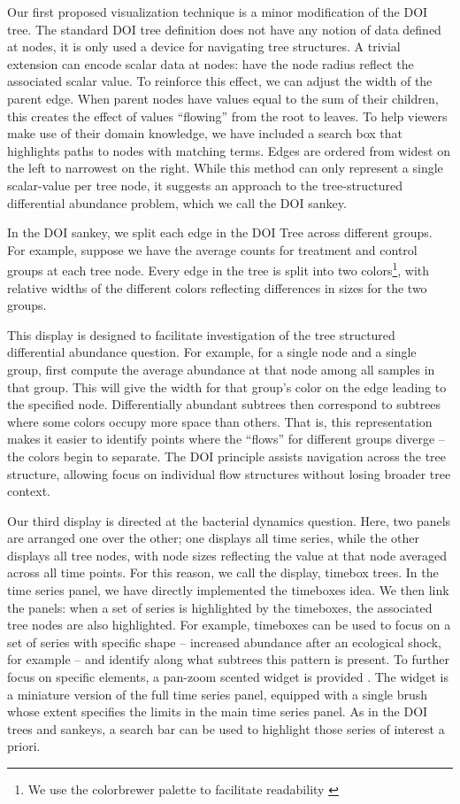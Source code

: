 Our first proposed visualization technique is a minor modification of the DOI
tree. The standard DOI tree definition does not have any notion of data defined
at nodes, it is only used a device for navigating tree structures. A trivial
extension can encode scalar data at nodes: have the node radius reflect the
associated scalar value. To reinforce this effect, we can adjust the width of
the parent edge. When parent nodes have values equal to the sum of their
children, this creates the effect of values ``flowing'' from the root to leaves.
To help viewers make use of their domain knowledge, we have included a search
box that highlights paths to nodes with matching terms. Edges are ordered from
widest on the left to narrowest on the right. While this method can only
represent a single scalar-value per tree node, it suggests an approach to the
tree-structured differential abundance problem, which we call the DOI sankey.

In the DOI sankey, we split each edge in the DOI Tree across different groups.
For example, suppose we have the average counts for treatment and control groups
at each tree node. Every edge in the tree is split into two colors\footnote{We
  use the colorbrewer palette to facilitate readability
  \citep{brewer2003colorbrewer}}, with relative widths of the different colors
reflecting differences in sizes for the two groups.

This display is designed to facilitate investigation of the tree structured
differential abundance question. For example, for a single node and a single
group, first compute the average abundance at that node among all samples in
that group. This will give the width for that group's color on the edge leading
to the specified node. Differentially abundant subtrees then correspond to
subtrees where some colors occupy more space than others. That is, this
representation makes it easier to identify points where the ``flows'' for
different groups diverge -- the colors begin to separate. The DOI principle
assists navigation across the tree structure, allowing focus on individual flow
structures without losing broader tree context.

Our third display is directed at the bacterial dynamics question. Here, two
panels are arranged one over the other; one displays all time series, while the
other displays all tree nodes, with node sizes reflecting the value at that node
averaged across all time points. For this reason, we call the display, timebox
trees. In the time series panel, we have directly implemented the timeboxes
idea. We then link the panels: when a set of series is highlighted by the
timeboxes, the associated tree nodes are also highlighted. For example,
timeboxes can be used to focus on a set of series with specific shape --
increased abundance after an ecological shock, for example -- and identify along
what subtrees this pattern is present. To further focus on specific elements, a
pan-zoom scented widget is provided \citep{willett2007scented}. The widget is a
miniature version of the full time series panel, equipped with a single brush
whose extent specifies the limits in the main time series panel. As in the DOI
trees and sankeys, a search bar can be used to highlight those series of
interest a priori.

